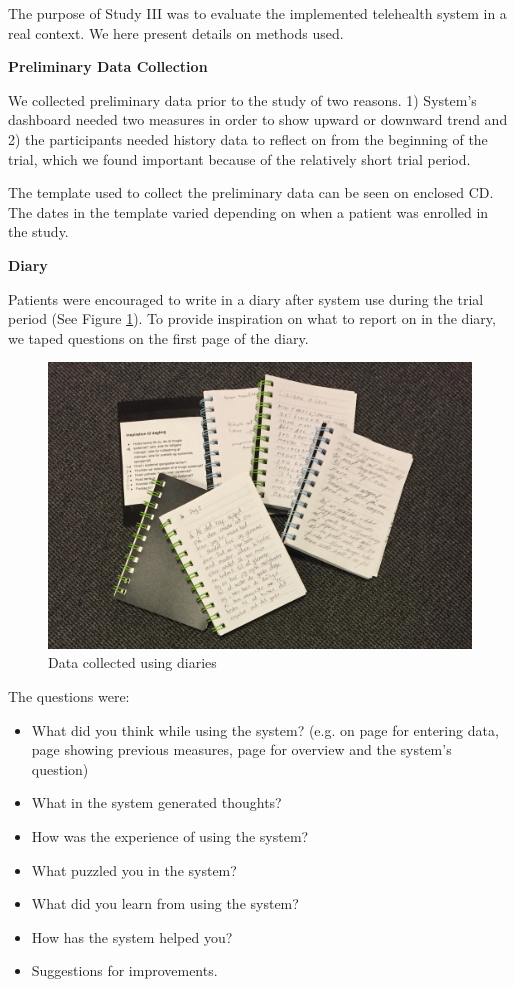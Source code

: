 The purpose of Study III was to evaluate the implemented telehealth system in a real context. We here present details on methods used.

\textbf{Preliminary Data Collection}

We collected preliminary data prior to the study of two reasons. 1) System's dashboard needed two measures in order to show upward or downward trend and 2) the participants needed history data to reflect on from the beginning of the trial, which we found important because of the relatively short trial period. 

The template used to collect the preliminary data can be seen on enclosed CD. The dates in the template varied depending on when a patient was enrolled in the study.

\textbf{Diary}

Patients were encouraged to write in a diary after system use during the trial period (See Figure \ref{fig:diaries}). To provide inspiration on what to report on in the diary, we taped questions on the first page of the diary.

\begin{figure}[!h] \centering
			\includegraphics[width=1\textwidth]{Images/study3/diaries.JPG}
		\caption{Data collected using diaries} \label{fig:diaries}
\end{figure}


The questions were:
\begin{itemize}
	\item What did you think while using the system? (e.g. on page for entering data, page showing previous measures, page for overview and the system's question)
	\item What in the system generated thoughts?
	\item How was the experience of using the system?
	\item What puzzled you in the system?
	\item What did you learn from using the system?
	\item How has the system helped you?
	\item Suggestions for improvements.
\end{itemize}

